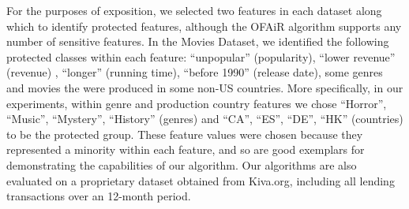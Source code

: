 For the purposes of exposition, we selected two features in each dataset along which to identify protected features, although the OFAiR algorithm supports any number of sensitive features. In the Movies Dataset, we identified the following protected classes within each feature: ``unpopular'' (popularity), ``lower revenue'' (revenue) , ``longer'' (running time), ``before 1990'' (release date), some genres and movies the were produced in some non-US countries. More specifically, in our experiments, within genre and production country features we chose ``Horror'', ``Music'', ``Mystery'', ``History'' (genres) and ``CA'', ``ES'', ``DE'', ``HK'' (countries) to be the protected group. These feature values were chosen because they represented a minority within each feature, and so are good exemplars for demonstrating the capabilities of our algorithm. Our algorithms are also evaluated on a proprietary dataset obtained from Kiva.org, including all lending transactions over an 12-month period. 




